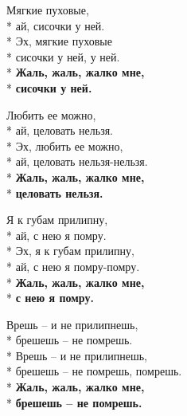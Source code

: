 \medskip

\begin{minipage}{\linewidth}
Мягкие пуховые,\\*
ай, сисочки у ней.\\*
Эх, мягкие пуховые\\*
сисочки у ней, у ней.\\*
\textbf{Жаль, жаль, жалко мне,}\\*
\textbf{сисочки у ней.}\\
\end{minipage}\par\medskip\nobreak

\medskip

\begin{minipage}{\linewidth}
Любить ее можно,\\*
ай, целовать нельзя.\\*
Эх, любить ее можно,\\*
ай, целовать нельзя-нельзя.\\*
\textbf{Жаль, жаль, жалко мне,}\\*
\textbf{целовать нельзя.}\\
\end{minipage}\par\medskip\nobreak

\medskip

\begin{minipage}{\linewidth}
Я к губам прилипну,\\*
ай, с нею я помру.\\*
Эх, я к губам прилипну,\\*
ай, с нею я помру-помру.\\*
\textbf{Жаль, жаль, жалко мне,}\\*
\textbf{с нею я помру.}\\
\end{minipage}\par\medskip\nobreak

\medskip

\begin{minipage}{\linewidth}
Врешь – и не прилипнешь,\\*
брешешь – не помрешь.\\*
Врешь – и не прилипнешь,\\*
брешешь – не помрешь, помрешь.\\*
\textbf{Жаль, жаль, жалко мне,}\\*
\textbf{брешешь – не помрешь.}\\
\end{minipage}

